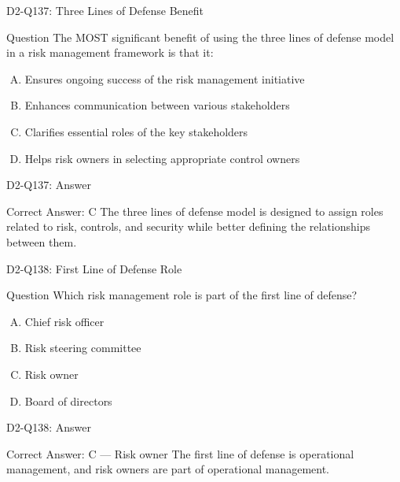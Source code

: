\documentclass{beamer}
\begin{document}
	\begin{frame}{D2-Q137: Three Lines of Defense Benefit}
		\begin{block}{Question}
			The MOST significant benefit of using the three lines of defense model in a risk management framework is that it:
		\end{block}
		\begin{enumerate}[(A)]
			\item Ensures ongoing success of the risk management initiative
			\item Enhances communication between various stakeholders
			\item Clarifies essential roles of the key stakeholders
			\item Helps risk owners in selecting appropriate control owners
		\end{enumerate}
	\end{frame}
	\begin{frame}{D2-Q137: Answer}
		\begin{block}{Correct Answer: C}
			The three lines of defense model is designed to assign roles related to risk, controls, and security while better defining the relationships between them.
		\end{block}
	\end{frame}
	
	\begin{frame}{D2-Q138: First Line of Defense Role}
		\begin{block}{Question}
			Which risk management role is part of the first line of defense?
		\end{block}
		\begin{enumerate}[(A)]
			\item Chief risk officer
			\item Risk steering committee
			\item Risk owner
			\item Board of directors
		\end{enumerate}
	\end{frame}
	\begin{frame}{D2-Q138: Answer}
		\begin{block}{Correct Answer: C --- Risk owner}
			The first line of defense is operational management, and risk owners are part of operational management.
		\end{block}
	\end{frame}
	
\end{document}
